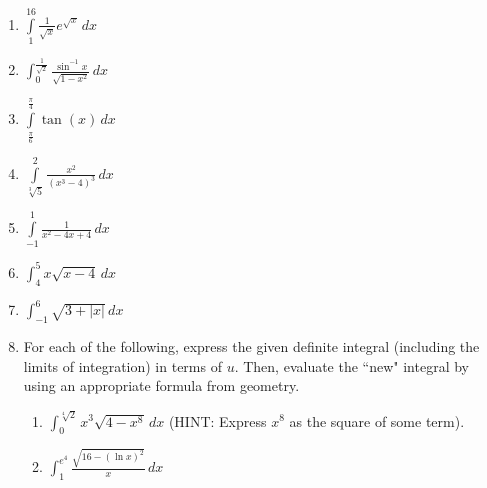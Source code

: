 \documentclass[12pt]{article}
\newif\ifans
\begin{document}
\begin{enumerate}
\item $\int\limits_{1}^{16}\frac{1}{\sqrt{x}}e^{\sqrt{x}}\,dx$ 

\ifans{\fbox{$-2e+2e^{4}$; Video Solution: \textcolor{blue}{\href{http://www.youtube.com/watch?v=0plDXxeFNvQ}{http://www.youtube.com/watch?v=0plDXxeFNvQ}}}} \fi

\item $\int_0^{\frac{1}{\sqrt{2}}} \frac{\sin^{-1}{x}}{\sqrt{1-x^2}} \,dx$

\ifans{\fbox{$\frac{\pi^2}{32}$}} \fi

\item $\int\limits_{\frac{\pi}{6}}^{\frac{\pi}{4}}\tan{(x)}\,dx$ 

\ifans{\fbox{$\frac{1}{2}(\ln{3}-\ln{2})$; Detailed Solution: \textcolor{blue}{\href{http://www.math.drexel.edu/classes/Calculus/resources/Math122HW/Solutions/122_06_Substitution_Definite_15.pdf}{Here}}}} \fi

\item $\int\limits_{\sqrt[3]{5}}^{2}\frac{x^2}{(x^3-4)^3}\,dx$ 

\ifans{\fbox{$\frac{5}{32}$}} \fi

\item $\int\limits_{-1}^{1}\frac{1}{x^2-4x+4}\,dx$ 

\ifans{\fbox{$\frac{2}{3}$}} \fi

\item $\int_4^5 x\sqrt{x-4} \,dx$

\ifans{\fbox{$\frac{46}{15}$; Video Solution: \textcolor{blue}{\href{https://www.youtube.com/watch?v=LE52v9SV_po}{https://www.youtube.com/watch?v=LE52v9SV\_po}}}} \fi

\item $\int_{-1}^6 \sqrt{3+|x|} \,dx$

\ifans{\fbox{$\frac{70}{3}-4\sqrt{3}$}} \fi

\item For each of the following, express the given definite integral (including the limits of integration) in terms of $u$.  Then, evaluate the ``new" integral by using an appropriate formula from geometry.

\begin{enumerate}

\item $\int_0^{\sqrt[4]{2}} x^3\sqrt{4-x^8} \,dx$ (HINT: Express $x^8$ as the square of some term).

\ifans{\fbox{$\frac{\pi}{4}$}} \fi

\item $\int_1^{e^4} \frac{\sqrt{16-(\ln{x})^2}}{x} \,dx$


\end{enumerate}
\end{enumerate}
\end{document}
